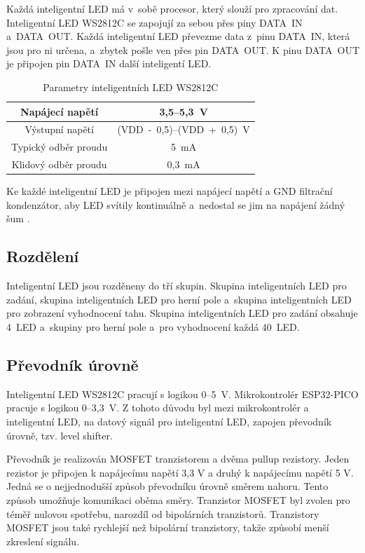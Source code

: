   Každá inteligentní LED má v~sobě procesor, který slouží pro zpracování dat. 
  Inteligentní LED WS2812C se zapojují za sebou přes piny DATA~IN a~DATA~OUT. Každá inteligentní LED převezme data z~pinu 
  DATA~IN, která jsou pro ni určena, a~zbytek pošle ven přes pin DATA~OUT. K pinu DATA~OUT je připojen pin DATA~IN další inteligentí LED. 

  \begin{table}[!h]
    \caption{Parametry inteligentních LED WS2812C \cite{WS2812C_datasheet}}
    \begin{center}
        \begin{tabular}{|c|c|}
            \hline
            Napájecí napětí       & 3,5--5,3~V \\
            \hline
            Výstupní napětí       & (VDD~-~0,5)--(VDD~+~0,5)~V \\
            \hline
            Typický odběr proudu  & 5~mA \\
            \hline
            Klidový odběr proudu  & 0,3~mA \\
            \hline
        \end{tabular}    
    \end{center}
  \end{table}

  Ke každé inteligentní LED je připojen mezi napájecí napětí a GND filtrační kondenzátor, aby LED svítily kontinuálně 
  a~nedostal se jim na napájení žádný šum \cite{WS2812C_datasheet}.

  \subsection{Rozdělení}
  Inteligentní LED jsou rozděneny do tří skupin. Skupina inteligentních LED pro zadání, skupina inteligentních LED pro herní pole 
  a~skupina inteligentních LED pro zobrazení vyhodnocení tahu.
  Skupina inteligentních LED pro zadání obsahuje 4~LED a~skupiny pro herní pole a~pro vyhodnocení každá 40~LED.

  \subsection{Převodník úrovně}
  Inteligentní LED WS2812C pracují s logikou 0--5~V. Mikrokontrolér ESP32-PICO pracuje s logikou 0--3,3~V. 
  Z tohoto důvodu byl mezi mikrokontrolér a inteligentní LED, na datový signál pro inteligentní LED, zapojen převodník úrovně, 
  tzv. level shifter. 
  
  Převodník je realizován MOSFET tranzistorem a dvěma pullup rezistory. Jeden rezistor je připojen k napájecímu napětí 3,3 V a druhý k 
  napájecímu napětí 5 V. Jedná se o nejjednodušší způsob převodníku úrovně směrem nahoru. Tento způsob umožňuje komunikaci oběma směry. 
  Tranzistor MOSFET byl zvolen pro téměř nulovou spotřebu, narozdíl od bipolárních tranzistorů. Tranzistory MOSFET jsou také rychlejší 
  než bipolární tranzistory, takže způsobí menší zkreslení signálu. 


